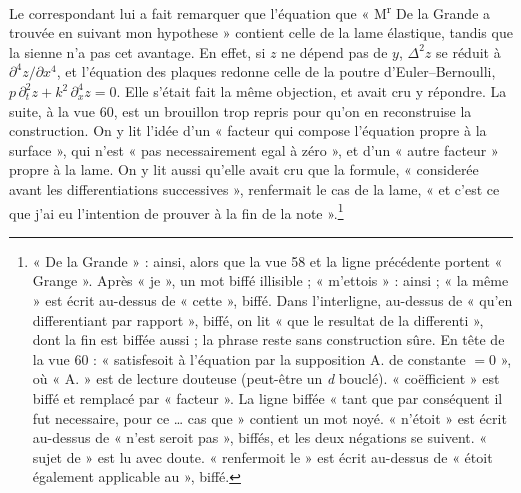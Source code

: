 \documentclass[11pt,a4paper]{article}
\begin{document}
Le correspondant lui a fait remarquer que l'équation que « M\textsuperscript{r}
De la Grande a trouvée en suivant mon hypothese » contient celle de la lame
élastique, tandis que la sienne n'a pas cet avantage. En effet, si \(z\) ne
dépend pas de \(y\), \(\Delta^2z\) se réduit à
\(\partial^4z/\partial x^4\), et l'équation des plaques redonne celle de la
poutre d'Euler–Bernoulli, \(p\,\partial_t^2z+k^2\,\partial_x^4z=0\).
Elle s'était fait la même objection, et avait cru y répondre. La suite, à la
vue 60, est un brouillon trop repris pour qu'on en reconstruise la
construction. On y lit l'idée d'un « facteur qui compose l'équation propre à la
surface », qui n'est « pas necessairement egal à zéro », et d'un « autre
facteur » propre à la lame. On y lit aussi qu'elle avait cru que la formule,
« considerée avant les differentiations successives », renfermait le cas de la
lame, « et c'est ce que j'ai eu l'intention de prouver à la fin de la
note ».\footnote{« De la Grande » : ainsi, alors que la vue 58 et la ligne
précédente portent « Grange ». Après « je », un mot biffé illisible ;
« m'ettois » : ainsi ; « la même » est écrit au-dessus de « cette », biffé.
Dans l'interligne, au-dessus de « qu'en differentiant par rapport », biffé, on
lit « que le resultat de la differenti », dont la fin est biffée aussi ; la
phrase reste sans construction sûre. En tête de la vue 60 : « satisfesoit à
l'équation par la supposition A. de constante \(=0\) », où « A. » est de
lecture douteuse (peut-être un \emph{d} bouclé). « coëfficient » est biffé et
remplacé par « facteur ». La ligne biffée « tant que par conséquent il fut
necessaire, pour ce … cas que » contient un mot noyé. « n'étoit » est écrit
au-dessus de « n'est seroit pas », biffés, et les deux négations se suivent.
« sujet de » est lu avec doute. « renfermoit le » est écrit au-dessus de
« étoit également applicable au », biffé.}
\end{document}
